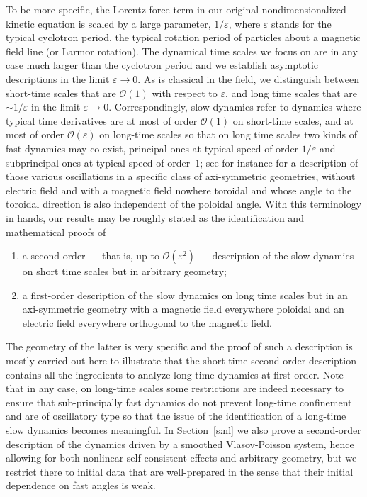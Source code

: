 \documentclass[10pt]{amsart}
\let\mathcal\mathscr
\let\eps\varepsilon
\theoremstyle{plain}
\theoremstyle{definition}
\newcommand\cO{{\mathcal O}}
\begin{document}
To be more specific, the Lorentz force term in our original nondimensionalized kinetic equation is scaled by a large parameter, $1/\eps$, where $\eps$ stands for the typical cyclotron period, \ie the typical rotation period of particles about a magnetic field line (or Larmor rotation). The dynamical time scales we focus on are in any case much larger than the cyclotron period and we establish asymptotic descriptions in the limit $\eps\to0$. As is classical in the field, we distinguish between short-time scales that are $\cO(1)$ with respect to $\eps$, and long time scales that are $\sim1/\eps$ in the limit $\eps\to0$. Correspondingly, slow dynamics refer to dynamics where typical time derivatives are at most of order $\cO(1)$ on short-time scales, and at most of order $\cO(\eps)$ on long-time scales so that on long time scales two kinds of fast dynamics may co-exist, principal ones at typical speed of order $1/\eps$ and subprincipal ones at typical speed of order~$1$; see for instance \cite{cheve2} for a description of those various oscillations in a specific class of axi-symmetric geometries, without electric field and with a magnetic field nowhere toroidal and whose angle to the toroidal direction is also independent of the poloidal angle. With this terminology in hands, our results may be roughly stated as the identification and mathematical proofs of
\begin{enumerate}
\item a second-order --- that is, up to $\cO(\eps^2)$ --- description of the slow dynamics on short time scales but in arbitrary geometry;
\item a first-order description of the slow dynamics on long time scales but in an axi-symmetric geometry with a magnetic field everywhere poloidal and an electric field everywhere orthogonal to the magnetic field.
\end{enumerate}
The geometry of the latter is very specific and the proof of such a description is mostly carried out here to illustrate that the short-time second-order description contains all the ingredients to analyze long-time dynamics at first-order. Note that in any case, on long-time scales some restrictions are indeed necessary to ensure that sub-principally fast dynamics do not prevent long-time confinement and are of oscillatory type so that the issue of the identification of a long-time slow dynamics becomes meaningful. In Section~\ref{s:nl} we also prove a second-order description of the dynamics driven by a smoothed Vlasov-Poisson system, hence allowing for both nonlinear self-consistent effects and arbitrary geometry, but we restrict there to initial data that are well-prepared in the sense that their initial dependence on fast angles is weak.
\end{document}
